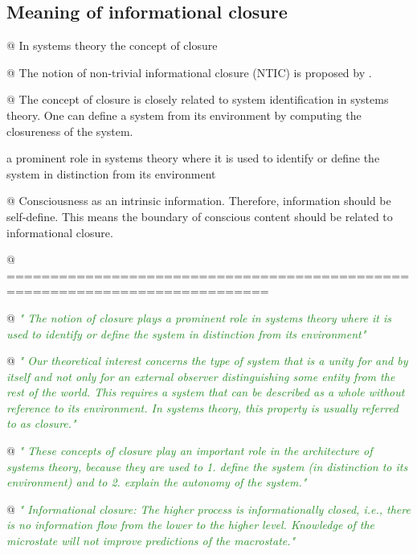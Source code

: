 \documentclass[utf8]{article}
\newenvironment{ants}
			{
			 \begin{easylist}[itemize]		
		 	}
			{
			\end{easylist}
			}
\newcommand{\rewrite}[1]{\textcolor{ForestGreen}{\textit{"#1"}}\newline}
\begin{document}
		\subsection{Meaning of informational closure}
			\begin{ants}
				@ In systems theory the concept of closure \citep{maturana1991autopoiesis, rosen1991life, pattee2012evolving, luhmann1995probleme}
							
				
				@ The notion of non-trivial informational closure (NTIC) is proposed by \cite{BERTSCHINGER.2006}. 
				
				@ The concept of closure is closely related to system identification in systems theory. One can define a system from its environment by computing the closureness of the system. 
				
				a prominent role in systems theory where it is used to identify or define the system in distinction from its environment
				
				@ Consciousness as an intrinsic information. Therefore, information should be self-define. This means the boundary of conscious content should be related to informational closure. 
				
				@ ============================================================================
				
				
				@ \rewrite{
					The notion of closure plays a prominent role in systems theory where it is used to identify or define the system in distinction from its environment} \cite{BERTSCHINGER.2006}
		
				@ \rewrite{
					Our theoretical interest concerns the type of system that is a unity for and by itself and not only for an external observer distinguishing some entity from the rest of the world. This requires a system that can be described as a whole without reference to its environment. In systems theory, this property is usually referred to as closure.}\citep{BERTSCHINGER.2006}
				
				@ \rewrite{
					These concepts of closure play an important role in the architecture of systems
					theory, because they are used to
					1. define the system (in distinction to its environment) and to 
					2. explain the autonomy of the system.}\citep{BERTSCHINGER.2006}
				
				@ \rewrite{
					Informational closure: The higher process is informationally closed, i.e., there is no information flow from the lower to the higher level. Knowledge of the microstate will not improve predictions of the macrostate.} \citep[p. 4]{PFANTE.2014}
				
								
			\end{ants}
	
\end{document}
